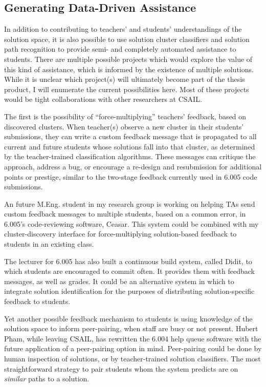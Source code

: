 \documentclass[12pt]{article}
\begin{document}
\subsection{Generating Data-Driven Assistance}

In addition to contributing to teachers' and students' understandings of the solution space, it is also possible to use solution cluster classifiers and solution path recognition to provide semi- and completely automated assistance to students. There are multiple possible projects which would explore the value of this kind of assistance, which is informed by the existence of multiple solutions. While it is unclear which project(s) will ultimately become part of the thesis product, I will enumerate the current possibilities here. Most of these projects would be tight collaborations with other researchers at CSAIL.

The first is the possibility of ``force-multiplying'' \cite{MOOCshop} teachers' feedback, based on discovered clusters. When teacher(s) observe a new cluster in their students' submissions, they can write a custom feedback message that is propagated to all current and future students whose solutions fall into that cluster, as determined by the teacher-trained classification algorithms. These messages can critique the approach, address a bug, or encourage a re-design and resubmission for additional points or prestige, similar to the two-stage feedback currently used in 6.005 code submissions. 

An future M.Eng. student in my research group is working on helping TAs send custom feedback messages to multiple students, based on a common error, in 6.005's code-reviewing software, Ceasar. This system could be combined with my cluster-discovery interface for force-multiplying solution-based feedback to students in an existing class.

The lecturer for 6.005 has also built a continuous build system, called Didit, to which students are encouraged to commit often. It provides them with feedback messages, as well as grades. It could be an alternative system in which to integrate solution identification for the purposes of distributing solution-specific feedback to students.

Yet another possible feedback mechanism to students is using knowledge of the solution space to inform peer-pairing, when staff are busy or not present. Hubert Pham, while leaving CSAIL, has rewritten the 6.004 help queue software with the future application of a peer-pairing option in mind. Peer-pairing could be done by human inspection of solutions, or by teacher-trained solution classifiers. The most straightforward strategy to pair students whom the system predicts are on {\em similar} paths to a solution. 
\end{document}
